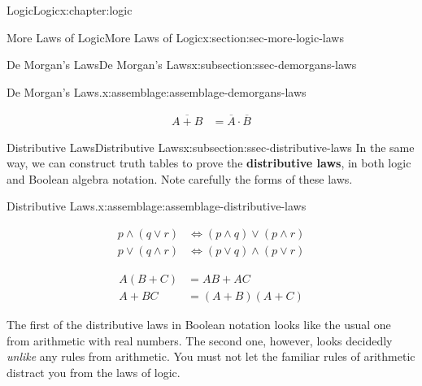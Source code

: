 \documentclass[twoside,10pt,]{book}
\newcommand{\tabularfont}{\relax}
\newcommand{\alert}[1]{\textbf{\textit{#1}}}
\newcommand{\terminology}[1]{\textbf{#1}}
\numberwithin{equation}{section}
\newcommand{\hrulemedium}{\noalign{\hrule height 0.07em}}
\newcommand{\amp}{&}
\begin{document}
\begin{chapterptx}{Logic}{}{Logic}{}{}{x:chapter:logic}
\begin{sectionptx}{More Laws of Logic}{}{More Laws of Logic}{}{}{x:section:sec-more-logic-laws}
\begin{subsectionptx}{De Morgan's Laws}{}{De Morgan's Laws}{}{}{x:subsection:ssec-demorgans-laws}
\begin{assemblage}{De Morgan's Laws.}{x:assemblage:assemblage-demorgans-laws}
\begin{sidebyside}{2}{0.15}{0.15}{0.1}
\begin{sbspanel}{0.3}
\begin{align*}
\overline{A+B}\amp =\overline{A}\cdot\overline{B}
\end{align*}
%
\end{sbspanel}%
\end{sidebyside}%
%
\end{assemblage}
%
\end{subsectionptx}
%
%
\typeout{************************************************}
\typeout{************************************************}
%
\begin{subsectionptx}{Distributive Laws}{}{Distributive Laws}{}{}{x:subsection:ssec-distributive-laws}
In the same way, we can construct truth tables to prove the \terminology{distributive laws}, in both logic and Boolean algebra notation.  Note carefully the forms of these laws. \begin{assemblage}{Distributive Laws.}{x:assemblage:assemblage-distributive-laws}%
\begin{sidebyside}{2}{0.1}{0.1}{0.2}%
\begin{sbspanel}{0.3}%
\resizebox{\ifdim\width > \linewidth\linewidth\else\width\fi}{!}{%
{\centering%
{\tabularfont%
\begin{tabular}{l}
\alert{Logic}\tabularnewline\hrulemedium
\end{tabular}
}%
\par}
}%
%
\begin{align*}
p{\wedge}(q{\vee} r)\amp\Leftrightarrow(p{\wedge} q){\vee}(p{\wedge} r)\\
p{\vee}(q{\wedge} r)\amp\Leftrightarrow(p{\vee} q){\wedge}(p{\vee} r)
\end{align*}
%
\end{sbspanel}%
\begin{sbspanel}{0.3}%
\par
\resizebox{\ifdim\width > \linewidth\linewidth\else\width\fi}{!}{%
{\centering%
{\tabularfont%
\begin{tabular}{l}
\alert{Boolean}\tabularnewline\hrulemedium
\end{tabular}
}%
\par}
}%
%
\begin{align*}
A(B+C)\amp =AB+AC\\
A+BC\amp =(A+B)(A+C)
\end{align*}
%
\end{sbspanel}%
\end{sidebyside}%
%
\end{assemblage}
 The first of the distributive laws in Boolean notation looks like the usual one from arithmetic with real numbers.  The second one, however, looks decidedly \emph{unlike} any rules from arithmetic.  You must not let the familiar rules of arithmetic distract you from the laws of logic.%

\end{subsectionptx}
\end{sectionptx}
\end{chapterptx}
\end{document}
